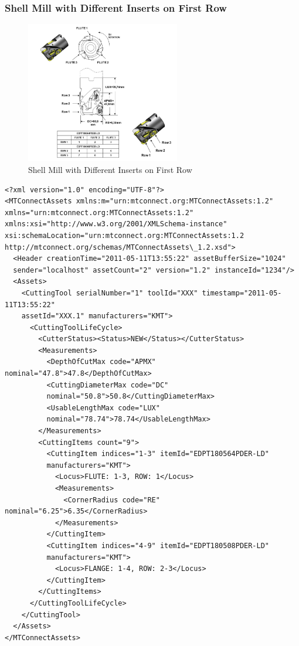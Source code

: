 \subsubsection{Shell Mill with Different Inserts on First Row}

\begin{figure}[ht]
  \centering
  \includegraphics[width=0.6\textwidth]{figures/a12-shell-mill-with-different-inserts-on-first-row.png}
  \caption{Shell Mill with Different Inserts on First Row}
  \label{fig:a12-shell-mill-with-different-inserts-on-first-row.png}
\end{figure}
\FloatBarrier

\begin{lstlisting}[firstnumber=1,escapechar=|,% 
caption={Example for Shell Mill with Different Inserts on First Row}, label={lst:shell-mill-with-different-inserts-on-first-row}]
<?xml version="1.0" encoding="UTF-8"?>
<MTConnectAssets xmlns:m="urn:mtconnect.org:MTConnectAssets:1.2" 
xmlns="urn:mtconnect.org:MTConnectAssets:1.2" 
xmlns:xsi="http://www.w3.org/2001/XMLSchema-instance" 
xsi:schemaLocation="urn:mtconnect.org:MTConnectAssets:1.2 
http://mtconnect.org/schemas/MTConnectAssets\_1.2.xsd">
  <Header creationTime="2011-05-11T13:55:22" assetBufferSize="1024" 
  sender="localhost" assetCount="2" version="1.2" instanceId="1234"/>
  <Assets>
    <CuttingTool serialNumber="1" toolId="XXX" timestamp="2011-05-11T13:55:22" 
    assetId="XXX.1" manufacturers="KMT">
      <CuttingToolLifeCycle>
        <CutterStatus><Status>NEW</Status></CutterStatus>
        <Measurements>
          <DepthOfCutMax code="APMX" nominal="47.8">47.8</DepthOfCutMax>
          <CuttingDiameterMax code="DC" 
          nominal="50.8">50.8</CuttingDiameterMax>
          <UsableLengthMax code="LUX" 
          nominal="78.74">78.74</UsableLengthMax>
        </Measurements>
        <CuttingItems count="9">
          <CuttingItem indices="1-3" itemId="EDPT180564PDER-LD" 
          manufacturers="KMT">
            <Locus>FLUTE: 1-3, ROW: 1</Locus>
            <Measurements>
              <CornerRadius code="RE" nominal="6.25">6.35</CornerRadius>
            </Measurements>
          </CuttingItem>
          <CuttingItem indices="4-9" itemId="EDPT180508PDER-LD" 
          manufacturers="KMT">
            <Locus>FLANGE: 1-4, ROW: 2-3</Locus>
          </CuttingItem>
        </CuttingItems>
      </CuttingToolLifeCycle>
    </CuttingTool>
  </Assets>
</MTConnectAssets>
\end{lstlisting}